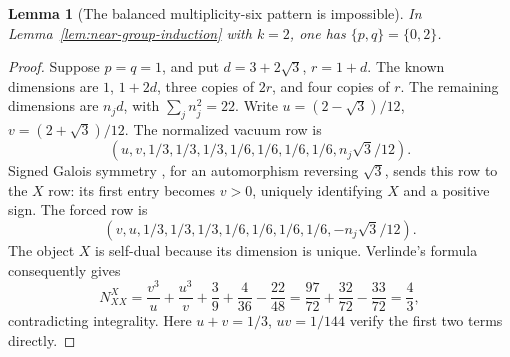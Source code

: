 \documentclass[11pt,a4paper]{article}
\newtheorem{lemma}[theorem]{Lemma}
\theoremstyle{definition}
\begin{document}
\begin{lemma}[The balanced multiplicity-six pattern is impossible]
\label{lem:m6-balanced}
In Lemma~\ref{lem:near-group-induction} with $k=2$, one has
$\{p,q\}=\{0,2\}$.
\end{lemma}
\begin{proof}
Suppose $p=q=1$, and put $d=3+2\sqrt3$, $r=1+d$.
The known dimensions are $1$, $1+2d$, three copies of $2r$, and four
copies of $r$. The remaining dimensions are $n_jd$, with
$\sum_jn_j^2=22$. Write
$u=(2-\sqrt3)/12$, $v=(2+\sqrt3)/12$.
The normalized vacuum row is
\[
 (u,v,1/3,1/3,1/3,1/6,1/6,1/6,1/6,n_j\sqrt3/12).
\]
Signed Galois symmetry \cite[Theorem~II(iii)]{DLN}, for an
automorphism reversing $\sqrt3$, sends this row to the $X$ row:
its first entry becomes $v>0$, uniquely identifying $X$ and a
positive sign. The forced row is
\[
 (v,u,1/3,1/3,1/3,1/6,1/6,1/6,1/6,-n_j\sqrt3/12).
\]
The object $X$ is self-dual because its dimension is unique.
Verlinde's formula consequently gives
\[
 N_{XX}^{X}=\frac{v^3}{u}+\frac{u^3}{v}
              +\frac39+\frac4{36}-\frac{22}{48}
            =\frac{97}{72}+\frac{32}{72}-\frac{33}{72}
            =\frac43,
\]
contradicting integrality. Here $u+v=1/3$, $uv=1/144$ verify the
first two terms directly.
\end{proof}
\end{document}
